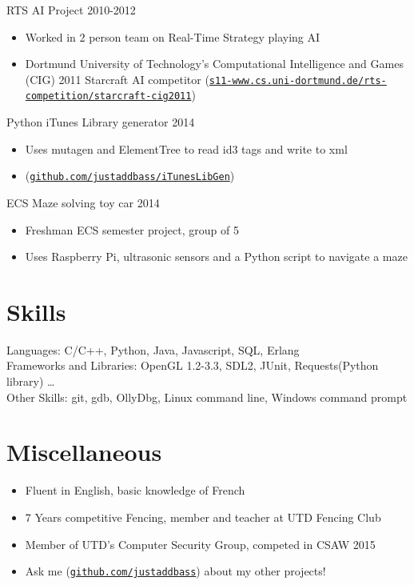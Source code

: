 \documentclass[line,margin]{res}
\begin{document}
\begin{resume}
\vspace{6pt}
RTS AI Project
\hfill 2010-2012
	\begin{itemize} \itemsep -2pt
	\item Worked in 2 person team on Real-Time Strategy playing AI
	\item Dortmund University of Technology’s Computational Intelligence and Games (CIG) 2011 Starcraft AI
        competitor (\href{https://www.s11-www.cs.uni-dortmund.de/rts-competition/starcraft-cig2011}{\texttt{s11-www.cs.uni-dortmund.de/rts-competition/starcraft-cig2011}})
	\end{itemize}

\vspace{6pt}
Python iTunes Library generator
\hfill 2014
	\begin{itemize} \itemsep -2pt
	\item Uses mutagen and ElementTree to read id3 tags and write to xml
	\item (\href{https://github.com/justaddbass/iTunesLibGen}{\texttt{github.com/justaddbass/iTunesLibGen}})
	\end{itemize}

\vspace{6pt}
ECS Maze solving toy car
\hfill 2014
	\begin{itemize} \itemsep -2pt
	\item Freshman ECS semester project, group of 5
	\item Uses Raspberry Pi, ultrasonic sensors and a Python script to navigate a maze
	\end{itemize}

\vspace{8pt}
\section{Skills}
\vspace{12pt}
	Languages: C/C++, Python, Java, Javascript, SQL, Erlang \\
	Frameworks and Libraries: OpenGL 1.2-3.3, SDL2, JUnit, Requests(Python library) \ldots \\
	Other Skills: git, gdb, OllyDbg, Linux command line, Windows command prompt

\vspace{cd 8pt}
\section{Miscellaneous}
\vspace{22pt}
	\begin{itemize} \itemsep -2pt
	\item Fluent in English, basic knowledge of French
	\item 7 Years competitive Fencing, member and teacher at UTD Fencing Club
	\item Member of UTD's Computer Security Group, competed in CSAW 2015
	\item Ask me (\href{https://github.com/justaddbass}{\texttt{github.com/justaddbass}}) about my other projects!
	\end{itemize}

\end{resume}
\end{document}
